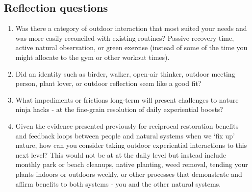 \documentclass[
]{book}
\providecommand{\tightlist}{%
  \setlength{\itemsep}{0pt}\setlength{\parskip}{0pt}}
\begin{document}
\hypertarget{reflection-questions-2}{%
\subsection*{Reflection questions}\label{reflection-questions-2}}

\begin{enumerate}
\def\labelenumi{\arabic{enumi}.}
\tightlist
\item
  Was there a category of outdoor interaction that most suited your needs and was more easily reconciled with existing routines? Passive recovery time, active natural observation, or green exercise (instead of some of the time you might allocate to the gym or other workout times).\\
\item
  Did an identity such as birder, walker, open-air thinker, outdoor meeting person, plant lover, or outdoor reflection seem like a good fit?\\
\item
  What impediments or frictions long-term will present challenges to nature ninja hacks - at the fine-grain resolution of daily experiential boosts?\\
\item
  Given the evidence presented previously for reciprocal restoration benefits and feedback loops between people and natural systems when we `fix up' nature, how can you consider taking outdoor experiential interactions to this next level? This would not be at at the daily level but instead include monthly park or beach cleanups, native planting, weed removal, tending your plants indoors or outdoors weekly, or other processes that demonstrate and affirm benefits to both systems - you and the other natural systems.
\end{enumerate}

  
\end{document}
